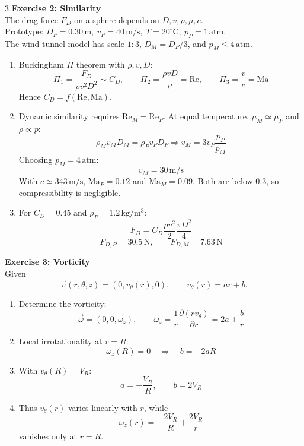 \documentclass[9pt, landscape, a4paper]{article}
\begin{document}
\begin{multicols*}{3}
\textbf{Exercise 2: Similarity}\\
The drag force $F_D$ on a sphere depends on $D,v,\rho,\mu,c$.\\
Prototype: $D_P=0.30\,\mathrm{m},\ v_P=40\,\mathrm{m/s},\
T=20^\circ\mathrm{C},\ p_P=1\,\mathrm{atm}$.\\
The wind-tunnel model has scale $1{:}3$, $D_M=D_P/3$, and
$p_M\leq4\,\mathrm{atm}$.
\begin{enumerate}[label=(\alph*)]
  \item Buckingham $\Pi$ theorem with $\rho,v,D$:
    \[
      \Pi_1=\frac{F_D}{\rho v^2D^2}\sim C_D,\qquad
      \Pi_2=\frac{\rho vD}{\mu}=\mathrm{Re},\qquad
      \Pi_3=\frac{v}{c}=\mathrm{Ma}
    \]
    Hence $C_D=f(\mathrm{Re},\mathrm{Ma})$.
  \item Dynamic similarity requires $\mathrm{Re}_M=\mathrm{Re}_P$.
    At equal temperature, $\mu_M\simeq\mu_P$ and $\rho\propto p$:
    \[
      \rho_Mv_MD_M=\rho_Pv_PD_P
      \Rightarrow
      v_M=3v_P\frac{p_P}{p_M}
    \]
    Choosing $p_M=4\,\mathrm{atm}$:
    \[
      v_M=30\,\mathrm{m/s}
    \]
    With $c\simeq343\,\mathrm{m/s}$,
    $\mathrm{Ma}_P=0.12$ and $\mathrm{Ma}_M=0.09$.
    Both are below $0.3$, so compressibility is negligible.
  \item For $C_D=0.45$ and $\rho_P=1.2\,\mathrm{kg/m^3}$:
    \[
      F_D=C_D\frac{\rho v^2}{2}\frac{\pi D^2}{4}
    \]
    \[
      F_{D,P}=30.5\,\mathrm{N},\qquad
      F_{D,M}=7.63\,\mathrm{N}
    \]
\end{enumerate}

\textbf{Exercise 3: Vorticity}\\
Given
\[
  \vec v(r,\theta,z)=(0,v_\theta(r),0),\qquad
  v_\theta(r)=ar+b.
\]
\begin{enumerate}[label=(\alph*)]
  \item Determine the vorticity:
    \[
      \vec\omega=(0,0,\omega_z),\qquad
      \omega_z=\frac{1}{r}\frac{\partial(rv_\theta)}{\partial r}
      =2a+\frac{b}{r}
    \]
  \item Local irrotationality at $r=R$:
    \[
      \omega_z(R)=0\quad\Rightarrow\quad b=-2aR
    \]
  \item With $v_\theta(R)=V_R$:
    \[
      a=-\frac{V_R}{R},\qquad b=2V_R
    \]
  \item Thus $v_\theta(r)$ varies linearly with $r$, while
    \[
      \omega_z(r)=-\frac{2V_R}{R}+\frac{2V_R}{r}
    \]
    vanishes only at $r=R$.
\end{enumerate}


\end{multicols*}
\end{document}
